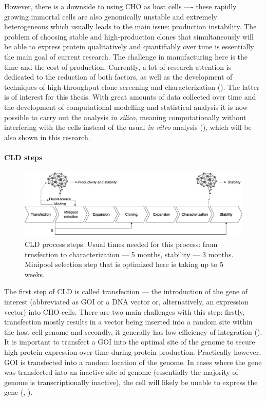 However, there is a downside to using CHO as host cells ---- these rapidly growing immortal cells are also genomically unstable and extremely heterogeneous which usually leads to the main issue: production instability. The problem of choosing stable and high-production clones that simultaneously will be able to express protein qualitatively and quantifiably over time is essentially the main goal of current research. The challenge in manufacturing here is the time and the cost of production. Currently, a lot of research attention is dedicated to the reduction of both factors, as well as the development of techniques of high-throughput clone screening and characterization (\cite{Tihanyi_2020}). The latter is of interest for this thesis. With great amounts of data collected over time and the development of computational modelling and statistical analysis it is now possible to carry out the analysis \textit{in silico}, meaning computationally without interfering with the cells instead of the usual \textit{in vitro} analysis (\cite{Christiansen_2018}), which will be also shown in this research.

\paragraph{CLD steps}
\label{section:cld-steps}
\begin{figure}[H]
	\begin{center}
		\includegraphics[width=0.8\linewidth]{bilder/CLD.png}
		\caption[CLD process steps]%
		{CLD process steps. Usual times needed for this process: from trnsfection to characterization --- 5 months, stability --- 3 months. Minipool selection step that is optimized here is taking up to 5 weeks.}\label{fig:cls-steps}
	\end{center}
\end{figure}

The first step of CLD is called transfection --- the introduction of the gene of interest (abbreviated as GOI or a DNA vector or, alternatively, an expression vector) into CHO cells. There are two main challenges with this step: firstly, transfection mostly results in a vector being inserted into a random site within the host cell genome and secondly, it generally has low efficiency of integration  (\cite{Tihanyi_2020}). It is important to transfect a GOI into the optimal site of the genome to secure high protein expression over time during protein production. Practically however, GOI is transfected into a random location of the genome. In cases where the gene was transfected into an inactive site of genome (essentially the majority of genome is transcriptionally inactive), the cell will likely be unable to express the gene (\cite{Castan_2018}, \cite{Hong_2018}).

